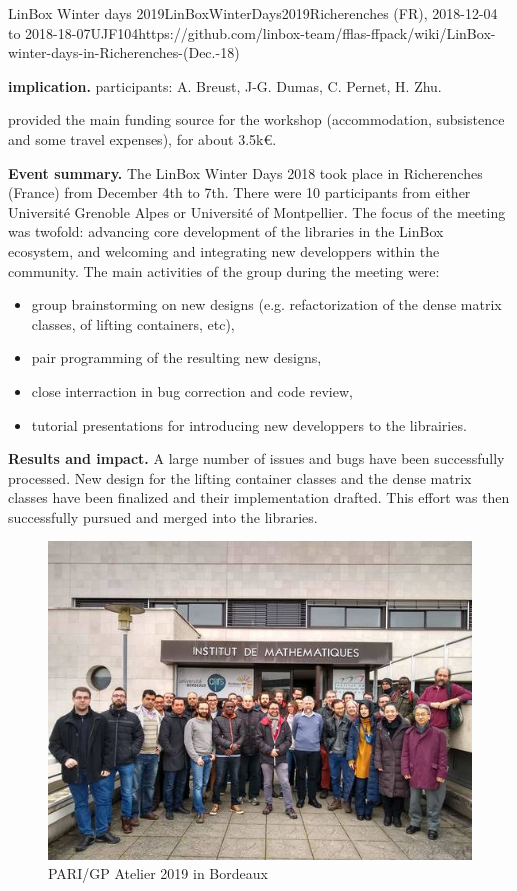 \begin{event}{LinBox Winter days 2019}{LinBoxWinterDays2019}{Richerenches (FR),
2018-12-04 to 2018-18-07}{UJF}{10}{4}{https://github.com/linbox-team/fflas-ffpack/wiki/LinBox-winter-days-in-Richerenches-(Dec.-18)}

\textbf{\ODK implication.} \ODK participants: A. Breust, J-G. Dumas, C. Pernet, H. Zhu.

\ODK provided the main funding source for the workshop (accommodation,
subsistence and some travel expenses), for about 3.5k\euro.

\textbf{Event summary.} The LinBox Winter Days 2018 took place in Richerenches
(France) from December 4th to 7th.
There were 10 participants from either Université Grenoble Alpes or Université of Montpellier. The focus of the meeting
was twofold: advancing core development of the libraries in the LinBox ecosystem, and welcoming and integrating new
developpers within the community. The main activities of the group during the meeting were:
\begin{itemize}
\item group brainstorming on new designs (e.g. refactorization of the dense matrix classes, of lifting containers, etc),
\item pair programming of the resulting new designs,
\item close interraction in bug correction and code review,
\item tutorial presentations for introducing new developpers to the librairies.
\end{itemize}

\textbf{Results and impact.} A large number of issues and bugs have been successfully processed. New design for the
lifting container classes and the dense matrix classes have been finalized and their implementation drafted. This effort
was then successfully pursued and merged into the libraries.


\begin{figure}[ht]
\includegraphics[scale=0.5]{pari2019.jpg}
\caption*{PARI/GP Atelier 2019 in Bordeaux}
\end{figure}

\end{event}
